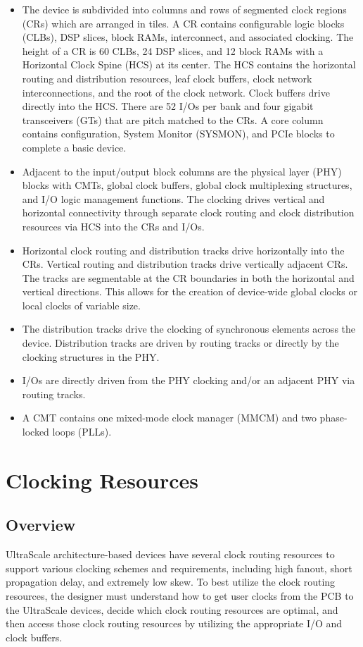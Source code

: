 \documentclass[12pt, a4paper]{report}
\begin{document}
    \begin{itemize}
        \item The device is subdivided into columns and rows of segmented clock regions (CRs) which are arranged in tiles. A CR contains configurable logic blocks (CLBs), DSP slices, block RAMs, interconnect, and associated clocking. The height of a CR is 60 CLBs, 24 DSP slices, and 12 block RAMs with a Horizontal Clock Spine (HCS) at its center. The HCS contains the horizontal routing and distribution resources, leaf clock buffers, clock network interconnections, and the root of the clock network. Clock buffers drive directly into the HCS. There are 52 I/Os per bank and four gigabit transceivers (GTs)
        that are pitch matched to the CRs. A core column contains configuration, System
        Monitor (SYSMON), and PCIe blocks to complete a basic device.

        \item Adjacent to the input/output block columns are the physical layer (PHY) blocks with
        CMTs, global clock buffers, global clock multiplexing structures, and I/O logic management functions. The clocking drives vertical and horizontal connectivity
        through separate clock routing and clock distribution resources via HCS into the CRs
        and I/Os.
        \item Horizontal clock routing and distribution tracks drive horizontally into the CRs. Vertical
        routing and distribution tracks drive vertically adjacent CRs. The tracks are
        segmentable at the CR boundaries in both the horizontal and vertical directions. This
        allows for the creation of device-wide global clocks or local clocks of variable size.
        \item The distribution tracks drive the clocking of synchronous elements across the device.
        Distribution tracks are driven by routing tracks or directly by the clocking structures in
        the PHY.
        \item I/Os are directly driven from the PHY clocking and/or an adjacent PHY via routing
        tracks.
        \item A CMT contains one mixed-mode clock manager (MMCM) and two phase-locked loops
        (PLLs).
    \end{itemize}

    \section{Clocking Resources}
    \subsection{Overview}
    UltraScale architecture-based devices have several clock routing resources to support various clocking schemes and requirements, including high fanout, short propagation delay, and extremely low skew. To best utilize the clock routing resources, the designer must
    understand how to get user clocks from the PCB to the UltraScale devices, decide which clock routing resources are optimal, and then access those clock routing resources by utilizing the appropriate I/O and clock buffers.
    
\end{document}
